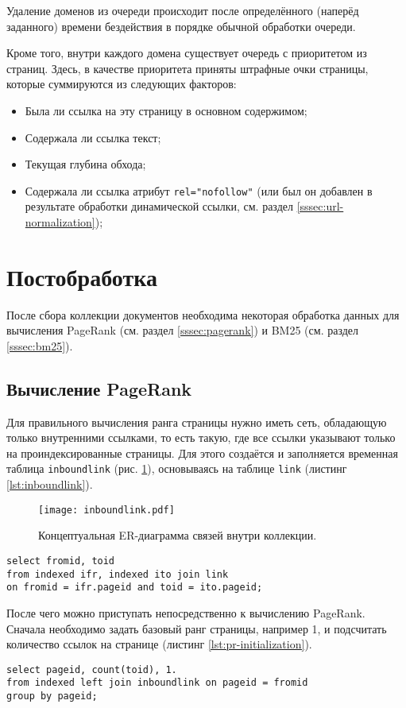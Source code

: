 Удаление доменов из очереди происходит после определённого (наперёд заданного) времени бездействия в порядке обычной обработки очереди.

Кроме того, внутри каждого домена существует очередь с приоритетом из страниц. Здесь, в качестве приоритета приняты штрафные очки страницы, которые суммируются из следующих факторов:
\begin{itemize}
  \item Была ли ссылка на эту страницу в основном содержимом;
  \item Содержала ли ссылка текст;
  \item Текущая глубина обхода;
  \item Содержала ли ссылка атрибут \verb|rel="nofollow"| (или был он добавлен в результате обработки динамической ссылки, см. раздел \ref{sssec:url-normalization});
\end{itemize}


\section{Постобработка}
После сбора коллекции документов необходима некоторая обработка данных для вычисления PageRank (см. раздел \ref{sssec:pagerank}) и BM25 (см. раздел \ref{sssec:bm25}).


\subsection{Вычисление PageRank}
Для правильного вычисления ранга страницы нужно иметь сеть, обладающую только внутренними ссылками, то есть такую, где все ссылки указывают только на проиндексированные страницы. Для этого создаётся и заполняется временная таблица \verb|inboundlink| (рис. \ref{fig:inboundlink}), основываясь на таблице \verb|link| (листинг \ref{lst:inboundlink}).
\begin{figure}[h]
  \centering
  \texttt{[image: inboundlink.pdf]}
  \caption{Концептуальная ER-диаграмма связей внутри коллекции.}
  \label{fig:inboundlink}
\end{figure}

\begin{lstlisting}[language=sqlite, caption=Выборка внутренних для коллекции ссылок., label=lst:inboundlink]
select fromid, toid
from indexed ifr, indexed ito join link
on fromid = ifr.pageid and toid = ito.pageid;
\end{lstlisting}

После чего можно приступать непосредственно к вычислению PageRank. Сначала необходимо задать базовый ранг страницы, например 1, и подсчитать количество ссылок на странице (листинг \ref{lst:pr-initialization}).
\begin{lstlisting}[language=sqlite, caption=Инициализация процесса вычисления PageRank., label=lst:pr-initialization]
select pageid, count(toid), 1.
from indexed left join inboundlink on pageid = fromid
group by pageid;
\end{lstlisting}

